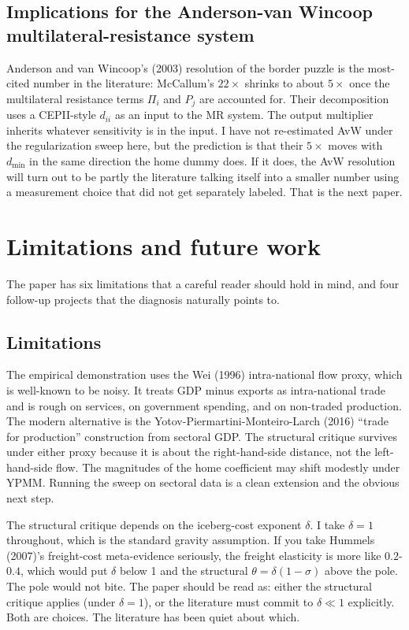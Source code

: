 \documentclass[11pt, letterpaper]{article}
\theoremstyle{definition}
\newcommand{\dii}{d_{ii}}
\begin{document}
\subsection{Implications for the Anderson-van Wincoop multilateral-resistance system}

Anderson and van Wincoop's (2003) resolution of the border puzzle is
the most-cited number in the literature: McCallum's $22\times$
shrinks to about $5\times$ once the multilateral resistance terms
$\Pi_i$ and $P_j$ are accounted for. Their decomposition uses a
CEPII-style $\dii$ as an input to the MR system. The output
multiplier inherits whatever sensitivity is in the input. I have not
re-estimated AvW under the regularization sweep here, but the
prediction is that their $5\times$ moves with $d_{\min}$ in the same
direction the home dummy does. If it does, the AvW resolution will
turn out to be partly the literature talking itself into a smaller
number using a measurement choice that did not get separately
labeled. That is the next paper.

\section{Limitations and future work}
\label{sec:limitations}

The paper has six limitations that a careful reader should hold in
mind, and four follow-up projects that the diagnosis naturally
points to.

\subsection{Limitations}

The empirical demonstration uses the Wei (1996) intra-national flow
proxy, which is well-known to be noisy. It treats GDP minus exports
as intra-national trade and is rough on services, on government
spending, and on non-traded production. The modern alternative is
the Yotov-Piermartini-Monteiro-Larch (2016) ``trade for production''
construction from sectoral GDP. The structural critique survives
under either proxy because it is about the right-hand-side
distance, not the left-hand-side flow. The magnitudes of the home
coefficient may shift modestly under YPMM. Running the sweep on
sectoral data is a clean extension and the obvious next step.

The structural critique depends on the iceberg-cost exponent
$\delta$. I take $\delta = 1$ throughout, which is the standard
gravity assumption. If you take Hummels (2007)'s freight-cost
meta-evidence seriously, the freight elasticity is more like
$0.2$-$0.4$, which would put $\delta$ below 1 and the structural
$\theta = \delta(1-\sigma)$ above the pole. The pole would not bite.
The paper should be read as: either the structural critique applies
(under $\delta = 1$), or the literature must commit to
$\delta \ll 1$ explicitly. Both are choices. The literature has been
quiet about which.
\end{document}
